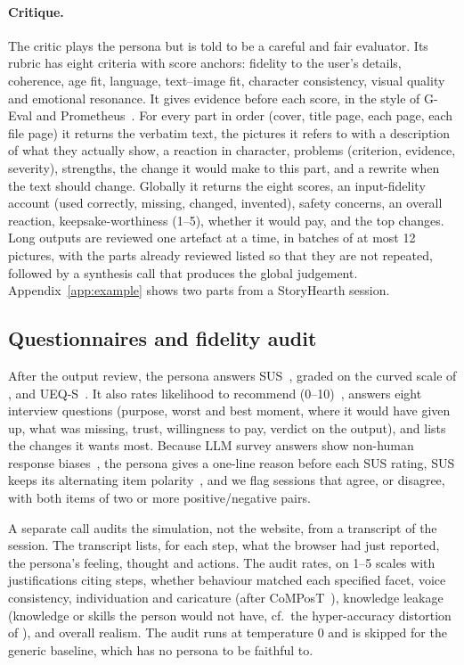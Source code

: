 \documentclass[10pt,twocolumn]{article}
\newcommand{\site}{StoryHearth}
\begin{document}
\paragraph{Critique.} The critic plays the persona but is told to be a careful and fair evaluator. Its rubric has eight criteria with score anchors: fidelity to the user's details, coherence, age fit, language, text--image fit, character consistency, visual quality and emotional resonance. It gives evidence before each score, in the style of G-Eval and Prometheus~\cite{liu2023geval,kim2024prometheus}. For every part in order (cover, title page, each page, each file page) it returns the verbatim text, the pictures it refers to with a description of what they actually show, a reaction in character, problems (criterion, evidence, severity), strengths, the change it would make to this part, and a rewrite when the text should change. Globally it returns the eight scores, an input-fidelity account (used correctly, missing, changed, invented), safety concerns, an overall reaction, keepsake-worthiness (1--5), whether it would pay, and the top changes. Long outputs are reviewed one artefact at a time, in batches of at most 12 pictures, with the parts already reviewed listed so that they are not repeated, followed by a synthesis call that produces the global judgement. Appendix~\ref{app:example} shows two parts from a \site{} session.

\subsection{Questionnaires and fidelity audit}
\label{sec:debrief}

After the output review, the persona answers SUS~\cite{brooke1996sus}, graded on the curved scale of \citet{sauro2016quantifying}, and UEQ-S~\cite{schrepp2017ueqs}. It also rates likelihood to recommend (0--10)~\cite{reichheld2003one}, answers eight interview questions (purpose, worst and best moment, where it would have given up, what was missing, trust, willingness to pay, verdict on the output), and lists the changes it wants most. Because LLM survey answers show non-human response biases~\cite{tjuatja2024llms,dominguez2024questioning}, the persona gives a one-line reason before each SUS rating, SUS keeps its alternating item polarity~\cite{sauro2011positive}, and we flag sessions that agree, or disagree, with both items of two or more positive/negative pairs.

A separate call audits the simulation, not the website, from a transcript of the session. The transcript lists, for each step, what the browser had just reported, the persona's feeling, thought and actions. The audit rates, on 1--5 scales with justifications citing steps, whether behaviour matched each specified facet, voice consistency, individuation and caricature (after CoMPosT~\cite{cheng2023compost}), knowledge leakage (knowledge or skills the person would not have, cf.\ the hyper-accuracy distortion of \citet{aher2023using}), and overall realism. The audit runs at temperature 0 and is skipped for the generic baseline, which has no persona to be faithful to.
\end{document}
